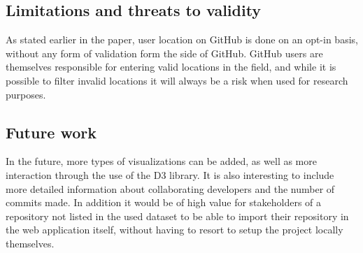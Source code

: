 \documentclass[acmtog, authorversion]{acmart}
\begin{document}
\subsection{Limitations and threats to validity}
As stated earlier in the paper, user location on GitHub is done on an opt-in basis, without any form of validation form the side of GitHub.
GitHub users are themselves responsible for entering valid locations in the field, and while it is possible to filter invalid locations it will always be a risk when used for research purposes.

\subsection{Future work}
In the future, more types of visualizations can be added, as well as more interaction through the use of the D3 library.
It is also interesting to include more detailed information about collaborating developers and the number of commits made.
In addition it would be of high value for stakeholders of a repository not listed in the used dataset to be able to import their repository in the web application itself, without having to resort to setup the project locally themselves.



\end{document}
